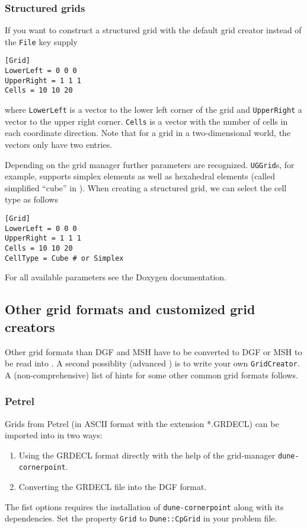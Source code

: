 \subsubsection{Structured grids}
If you want to construct a structured grid with the default grid creator instead of the \texttt{File} key supply
\begin{lstlisting}[style=DumuxParameterFile]
[Grid]
LowerLeft = 0 0 0
UpperRight = 1 1 1
Cells = 10 10 20
\end{lstlisting}
where \texttt{LowerLeft} is a vector to the lower left corner of the grid and \texttt{UpperRight} a vector to the upper right corner.
\texttt{Cells} is a vector with the number of cells in each coordinate direction. Note that for a grid in a two-dimensional world, the
vectors only have two entries.

Depending on the grid manager further parameters are recognized.
\texttt{UGGrid}s, for example, supports simplex elements as well as hexahedral elements
(called simplified ``cube'' in \Dune). When creating a structured grid, we can select the cell type as follows
\begin{lstlisting}[style=DumuxParameterFile]
[Grid]
LowerLeft = 0 0 0
UpperRight = 1 1 1
Cells = 10 10 20
CellType = Cube # or Simplex
\end{lstlisting}
For all available parameters see the Doxygen documentation.

\subsection{Other grid formats and customized grid creators}
Other grid formats than DGF and MSH have to be converted to DGF or MSH to be read into \Dumux. A second possiblity (advanced \Cplusplus) is to write your own
\texttt{GridCreator}.
A (non-comprehensive) list of hints for some other common grid formats follows.

\subsubsection{Petrel}
Grids from Petrel (in ASCII format with the extension *.GRDECL) can be imported into \Dumux in two ways:
  \begin{enumerate}
  \item Using the GRDECL format directly with the help of the grid-manager \texttt{dune-cornerpoint}.
  \item Converting the GRDECL file into the DGF format.
  \end{enumerate}
The fist options requires the installation of \texttt{dune-cornerpoint} along with its dependencies. Set the property \texttt{Grid} to \texttt{Dune::CpGrid} in your problem file.

